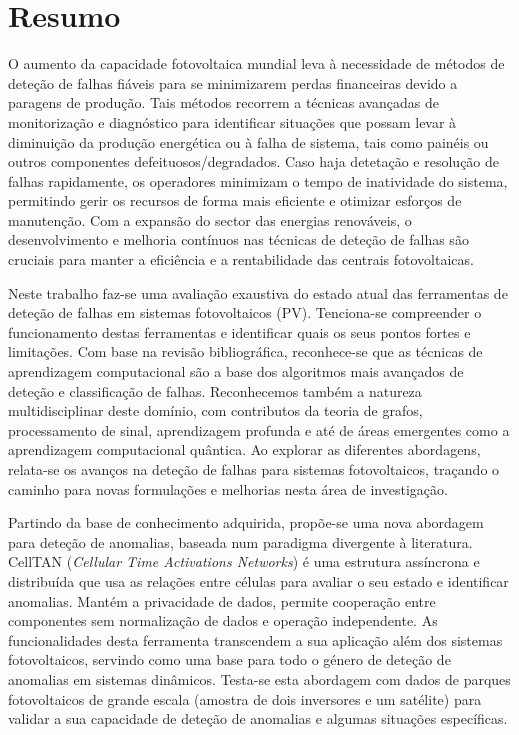 \chapter*{Resumo}

O aumento da capacidade fotovoltaica mundial leva à necessidade de métodos de deteção de falhas fiáveis para se minimizarem perdas financeiras devido a paragens de produção. Tais métodos recorrem a técnicas avançadas de monitorização e diagnóstico para identificar situações que possam levar à diminuição da produção energética ou à falha de sistema, tais como painéis ou outros componentes defeituosos/degradados. Caso haja detetação e resolução de falhas rapidamente, os operadores minimizam o tempo de inatividade do sistema, permitindo gerir os recursos de forma mais eficiente e otimizar esforços de manutenção. Com a expansão do sector das energias renováveis, o desenvolvimento e melhoria contínuos nas técnicas de deteção de falhas são cruciais para manter a eficiência e a rentabilidade das centrais fotovoltaicas.

Neste trabalho faz-se uma avaliação exaustiva do estado atual das ferramentas de deteção de falhas em sistemas fotovoltaicos (PV). Tenciona-se compreender o funcionamento destas ferramentas e identificar quais os seus pontos fortes e limitações. Com base na revisão bibliográfica, reconhece-se que as técnicas de aprendizagem computacional são a base dos algoritmos mais avançados de deteção e classificação de falhas. Reconhecemos também a natureza multidisciplinar deste domínio, com contributos da teoria de grafos, processamento de sinal, aprendizagem profunda e até de áreas emergentes como a aprendizagem computacional quântica. Ao explorar as diferentes abordagens, relata-se os avanços na deteção de falhas para sistemas fotovoltaicos, traçando o caminho para novas formulações e melhorias nesta área de investigação.

Partindo da base de conhecimento adquirida, propõe-se uma nova abordagem para deteção de anomalias, baseada num paradigma divergente à literatura. CellTAN (\textit{Cellular Time Activations Networks}) é uma estrutura assíncrona e distribuída que usa as relações entre células para avaliar o seu estado e identificar anomalias. Mantém a privacidade de dados, permite cooperação entre componentes sem normalização de dados e operação independente. As funcionalidades desta ferramenta transcendem a sua aplicação além dos sistemas fotovoltaicos, servindo como uma base para todo o género de deteção de anomalias em sistemas dinâmicos.
Testa-se esta abordagem com dados de parques fotovoltaicos de grande escala (amostra de dois inversores e um satélite) para validar a sua capacidade de deteção de anomalias e algumas situações específicas.

